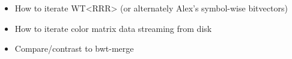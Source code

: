 \documentclass[doctor]{thesis}
\begin{document}
\begin{itemize}
\item How to iterate WT<RRR> (or alternately Alex's symbol-wise bitvectors)
\item How to iterate color matrix data streaming from disk
\item Compare/contrast to bwt-merge

  \end{itemize}
















































































 
\appendix 
\end{document}

